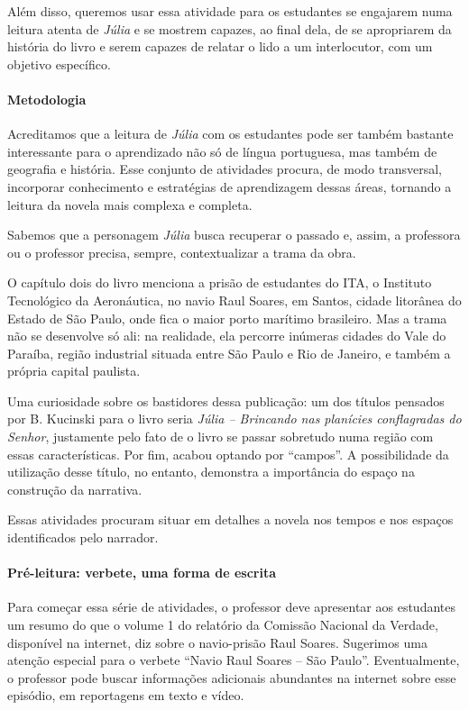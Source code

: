 \documentclass[12pt]{extarticle}
\begin{document}

Além disso, queremos usar essa atividade para os estudantes se engajarem
numa leitura atenta de \emph{Júlia} e se mostrem capazes, ao final dela,
de se apropriarem da história do livro e serem capazes de relatar o lido
a um interlocutor, com um objetivo específico.

\paragraph{Metodologia}

Acreditamos que a leitura de \emph{Júlia} com os estudantes pode ser
também bastante interessante para o aprendizado não só de língua
portuguesa, mas também de geografia e história. Esse conjunto de
atividades procura, de modo transversal, incorporar conhecimento e
estratégias de aprendizagem dessas áreas, tornando a leitura da novela
mais complexa e completa.

Sabemos que a personagem \emph{Júlia} busca recuperar o passado e,
assim, a professora ou o professor precisa, sempre, contextualizar a
trama da obra.

O capítulo dois do livro menciona a prisão de estudantes do ITA, o
Instituto Tecnológico da Aeronáutica, no navio Raul Soares, em Santos,
cidade litorânea do Estado de São Paulo, onde fica o maior porto
marítimo brasileiro. Mas a trama não se desenvolve só ali: na realidade,
ela percorre inúmeras cidades do Vale do Paraíba, região industrial
situada entre São Paulo e Rio de Janeiro, e também a própria capital
paulista.


Uma curiosidade sobre os bastidores dessa publicação: um dos títulos
pensados por B. Kucinski para o livro seria \emph{Júlia -- Brincando nas
planícies conflagradas do Senhor}, justamente pelo fato de o livro se
passar sobretudo numa região com essas características. Por fim, acabou
optando por ``campos''. A possibilidade da utilização desse título, no
entanto, demonstra a importância do espaço na construção da narrativa.

Essas atividades procuram situar em detalhes a novela nos tempos e nos
espaços identificados pelo narrador.

\paragraph{Pré-leitura: verbete, uma forma de escrita}

Para começar essa série de atividades, o professor deve apresentar aos
estudantes um resumo do que o volume 1 do relatório da Comissão Nacional
da Verdade, disponível na internet, diz sobre o navio-prisão Raul
Soares. Sugerimos uma atenção especial para o verbete ``Navio Raul
Soares -- São Paulo''. Eventualmente, o professor pode buscar informações
adicionais abundantes na internet sobre esse episódio, em reportagens em
texto e vídeo.
\end{document}
